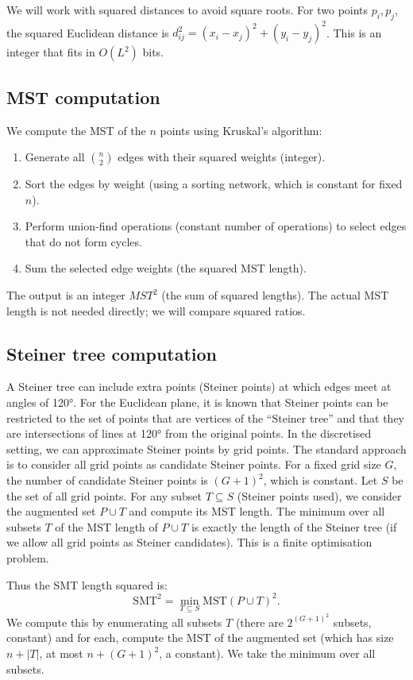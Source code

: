\documentclass[11pt,a4paper]{article}
\begin{document}
We will work with squared distances to avoid square roots. For two points \(p_i, p_j\), the squared Euclidean distance is \(d_{ij}^2 = (x_i - x_j)^2 + (y_i - y_j)^2\). This is an integer that fits in \(O(L^2)\) bits.

\subsection{MST computation}
We compute the MST of the \(n\) points using Kruskal's algorithm:
\begin{enumerate}
\item Generate all \(\binom{n}{2}\) edges with their squared weights (integer).
\item Sort the edges by weight (using a sorting network, which is constant for fixed \(n\)).
\item Perform union‑find operations (constant number of operations) to select edges that do not form cycles.
\item Sum the selected edge weights (the squared MST length).
\end{enumerate}
The output is an integer \(MST^2\) (the sum of squared lengths). The actual MST length is not needed directly; we will compare squared ratios.

\subsection{Steiner tree computation}
A Steiner tree can include extra points (Steiner points) at which edges meet at angles of 120°. For the Euclidean plane, it is known that Steiner points can be restricted to the set of points that are vertices of the “Steiner tree” and that they are intersections of lines at 120° from the original points. In the discretised setting, we can approximate Steiner points by grid points. The standard approach is to consider all grid points as candidate Steiner points. For a fixed grid size \(G\), the number of candidate Steiner points is \((G+1)^2\), which is constant. Let \(S\) be the set of all grid points. For any subset \(T \subseteq S\) (Steiner points used), we consider the augmented set \(P \cup T\) and compute its MST length. The minimum over all subsets \(T\) of the MST length of \(P \cup T\) is exactly the length of the Steiner tree (if we allow all grid points as Steiner candidates). This is a finite optimisation problem.

Thus the SMT length squared is:
\[
\text{SMT}^2 = \min_{T \subseteq S} \text{MST}(P \cup T)^2.
\]
We compute this by enumerating all subsets \(T\) (there are \(2^{(G+1)^2}\) subsets, constant) and for each, compute the MST of the augmented set (which has size \(n + |T|\), at most \(n + (G+1)^2\), a constant). We take the minimum over all subsets.
\end{document}
